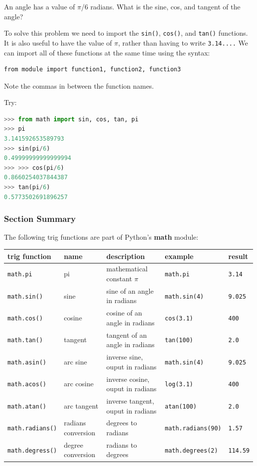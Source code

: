 \documentclass{book}
\begin{document}
An angle has a value of \(\pi\)/6 radians. What is the sine, cos, and
tangent of the angle?

To solve this problem we need to import the \lstinline!sin()!,
\lstinline!cos()!, and \lstinline!tan()! functions. It is also useful to
have the value of \(\pi\), rather than having to write
\lstinline!3.14....! We can import all of these functions at the same
time using the syntax:

\begin{lstlisting}
from module import function1, function2, function3
\end{lstlisting}

Note the commas in between the function names.

Try:

\begin{lstlisting}[language=Python]
>>> from math import sin, cos, tan, pi
>>> pi
3.141592653589793
>>> sin(pi/6)
0.49999999999999994
>>> >>> cos(pi/6)
0.8660254037844387
>>> tan(pi/6)
0.5773502691896257
\end{lstlisting}
    




    
        \subsubsection{Section Summary}\label{section-summary}

The following trig functions are part of Python's \textbf{math} module:

\begin{longtable}[]{@{}lllll@{}}
\toprule
trig function & name & description & example & result\tabularnewline
\midrule
\endhead
\lstinline!math.pi! & pi & mathematical constant \(\pi\) &
\lstinline!math.pi! & \lstinline!3.14!\tabularnewline
\lstinline!math.sin()! & sine & sine of an angle in radians &
\lstinline!math.sin(4)! & \lstinline!9.025!\tabularnewline
\lstinline!math.cos()! & cosine & cosine of an angle in radians &
\lstinline!cos(3.1)! & \lstinline!400!\tabularnewline
\lstinline!math.tan()! & tangent & tangent of an angle in radians &
\lstinline!tan(100)! & \lstinline!2.0!\tabularnewline
\lstinline!math.asin()! & arc sine & inverse sine, ouput in radians &
\lstinline!math.sin(4)! & \lstinline!9.025!\tabularnewline
\lstinline!math.acos()! & arc cosine & inverse cosine, ouput in radians
& \lstinline!log(3.1)! & \lstinline!400!\tabularnewline
\lstinline!math.atan()! & arc tangent & inverse tangent, ouput in
radians & \lstinline!atan(100)! & \lstinline!2.0!\tabularnewline
\lstinline!math.radians()! & radians conversion & degrees to radians &
\lstinline!math.radians(90)! & \lstinline!1.57!\tabularnewline
\lstinline!math.degress()! & degree conversion & radians to degrees &
\lstinline!math.degrees(2)! & \lstinline!114.59!\tabularnewline
\bottomrule
\end{longtable}
    
\end{document}
